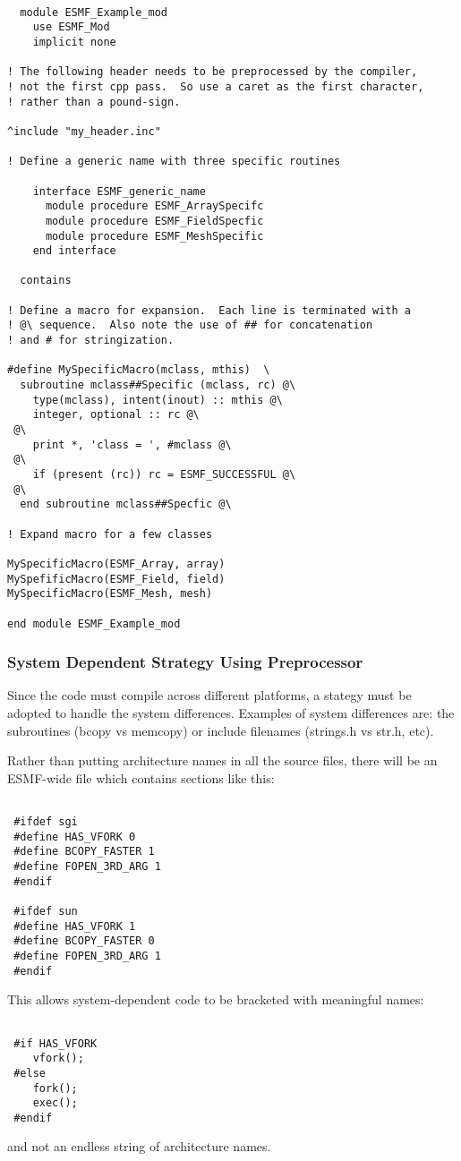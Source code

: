 \begin{verbatim}

  module ESMF_Example_mod
    use ESMF_Mod
    implicit none

! The following header needs to be preprocessed by the compiler,
! not the first cpp pass.  So use a caret as the first character,
! rather than a pound-sign.

^include "my_header.inc"

! Define a generic name with three specific routines

    interface ESMF_generic_name
      module procedure ESMF_ArraySpecifc
      module procedure ESMF_FieldSpecfic
      module procedure ESMF_MeshSpecific
    end interface

  contains

! Define a macro for expansion.  Each line is terminated with a
! @\ sequence.  Also note the use of ## for concatenation
! and # for stringization.

#define MySpecificMacro(mclass, mthis)  \
  subroutine mclass##Specific (mclass, rc) @\
    type(mclass), intent(inout) :: mthis @\
    integer, optional :: rc @\
 @\
    print *, 'class = ', #mclass @\
 @\
    if (present (rc)) rc = ESMF_SUCCESSFUL @\
 @\
  end subroutine mclass##Specfic @\

! Expand macro for a few classes

MySpecificMacro(ESMF_Array, array)
MySpefificMacro(ESMF_Field, field)
MySpecificMacro(ESMF_Mesh, mesh)

end module ESMF_Example_mod

\end{verbatim}

\subsubsection{System Dependent Strategy Using Preprocessor} Since the code
must compile across different platforms, a stategy must be adopted to
handle the system differences. Examples of system differences are: the
subroutines (bcopy vs memcopy) or include filenames (strings.h vs str.h,
etc).

Rather than putting architecture names in all the source files, there will
be an ESMF-wide file which contains sections like this: 
\begin{verbatim}

 #ifdef sgi 
 #define HAS_VFORK 0 
 #define BCOPY_FASTER 1 
 #define FOPEN_3RD_ARG 1 
 #endif

 #ifdef sun 
 #define HAS_VFORK 1 
 #define BCOPY_FASTER 0 
 #define FOPEN_3RD_ARG 1 
 #endif

\end{verbatim} This allows system-dependent code to be bracketed with
meaningful names: 

\begin{verbatim} 

 #if HAS_VFORK
    vfork();
 #else
    fork(); 
    exec();
 #endif

\end{verbatim} 
and not an endless string of architecture names.

